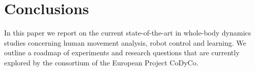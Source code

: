 \documentclass[final,5p,twocolumn]{elsarticle}
\begin{document}
%
%
%

\section{Conclusions}

In this paper we report on the current state-of-the-art in whole-body dynamics studies concerning human movement analysis, robot control and learning. We outline a roadmap of experiments  and  research  questions  that  are  currently  explored  by  the  consortium  of the European Project CoDyCo.
\end{document}
